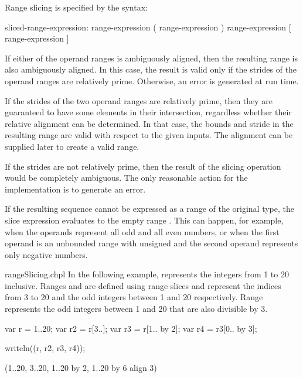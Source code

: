 Range slicing is specified by the syntax:
\begin{syntax}
sliced-range-expression:
  range-expression ( range-expression )
  range-expression [ range-expression ]
\end{syntax}

If either of the operand ranges is ambiguously aligned, then the resulting range
is also ambiguously aligned.  In this case, the result is valid only if the
strides of the operand ranges are relatively prime.  Otherwise, an error is
generated at run time.

\begin{rationale}
If the strides of the two operand ranges are relatively prime, then they are
guaranteed to have some elements in their intersection, regardless whether their
relative alignment can be determined.  In that case, the bounds and stride in the resulting
range are valid with respect to the given inputs.
The alignment can be supplied later to create a valid range.

If the strides are not relatively prime, then the result of the slicing
operation would be completely ambiguous.  The only reasonable action for the
implementation is to generate an error.
\end{rationale}

If the resulting sequence cannot be expressed as a range of the
original type, the slice expression evaluates to the empty
range . This can happen, for example, when the operands
represent all odd and all even numbers, or when the first operand is
an unbounded range with unsigned  and the second operand
represents only negative numbers.

\begin{chapelexample}{rangeSlicing.chpl}
In the following example,  represents the integers from 1 to
20 inclusive.  Ranges  and  are defined using range
slices and represent the indices from 3 to 20 and the odd integers
between 1 and 20 respectively. Range  represents the odd
integers between 1 and 20 that are also divisible by 3.
\begin{chapel}
var r = 1..20;
var r2 = r[3..];
var r3 = r[1.. by 2];
var r4 = r3[0.. by 3];
\end{chapel}
\begin{chapelpost}
writeln((r, r2, r3, r4));
\end{chapelpost}
\begin{chapeloutput}
(1..20, 3..20, 1..20 by 2, 1..20 by 6 align 3)
\end{chapeloutput}
\end{chapelexample}


